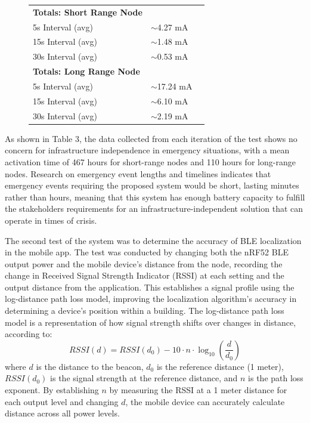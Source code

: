 \documentclass[english,12pt,a4paper,titlepage]{article}
\begin{document}
\begin{figure}[H]
\begin{tabular}{>{\raggedright\arraybackslash}p{9cm} >{\centering\arraybackslash}p{2.5cm} >{\centering\arraybackslash}p{2.5cm}}
			\textbf{Totals: Short Range Node} & & \\
			\quad 5s Interval (avg) & $\sim$4.27 mA &  \\
			\quad 15s Interval (avg) & $\sim$1.48 mA &  \\
			\quad 30s Interval (avg) & $\sim$0.53 mA &  \\
			\midrule
			\textbf{Totals: Long Range Node} & & \\
			\quad 5s Interval (avg) & $\sim$17.24 mA &  \\
			\quad 15s Interval (avg) & $\sim$6.10 mA &  \\
			\quad 30s Interval (avg) & $\sim$2.19 mA &  \\
			\bottomrule
		\end{tabular}
	\end{figure}
	
	As shown in Table 3, the data collected from each iteration of the test shows no concern for infrastructure independence in emergency situations, with a mean activation time of 467 hours for short-range nodes and 110 hours for long-range nodes. Research on emergency event lengths and timelines indicates that emergency events requiring the proposed system would be short, lasting minutes rather than hours, meaning that this system has enough battery capacity to fulfill the stakeholders requirements for an infrastructure-independent solution that can operate in times of crisis. 
	
	The second test of the system was to determine the accuracy of BLE localization in the mobile app. The test was conducted by changing both the nRF52 BLE output power and the mobile device's distance from the node, recording the change in Received Signal Strength Indicator (RSSI) at each setting and the output distance from the application. This establishes a signal profile using the log-distance path loss model, improving the localization algorithm's accuracy in determining a device's position within a building. The log-distance path loss model is a representation of how signal strength shifts over changes in distance, according to: 
	\begin{equation}
		RSSI(d) = RSSI(d_0) - 10 \cdot n \cdot \log_{10}\!\left(\frac{d}{d_0}\right)
	\end{equation}
	\noindent
	where $d$ is the distance to the beacon, $d_0$ is the reference distance (1 meter), $RSSI(d_0)$ is the signal strength at the reference distance, and $n$ is the path loss exponent. By establishing $n$ by measuring the RSSI at a 1 meter distance for each output level and changing $d$, the mobile device can accurately calculate distance across all power levels.
	
\end{document}
